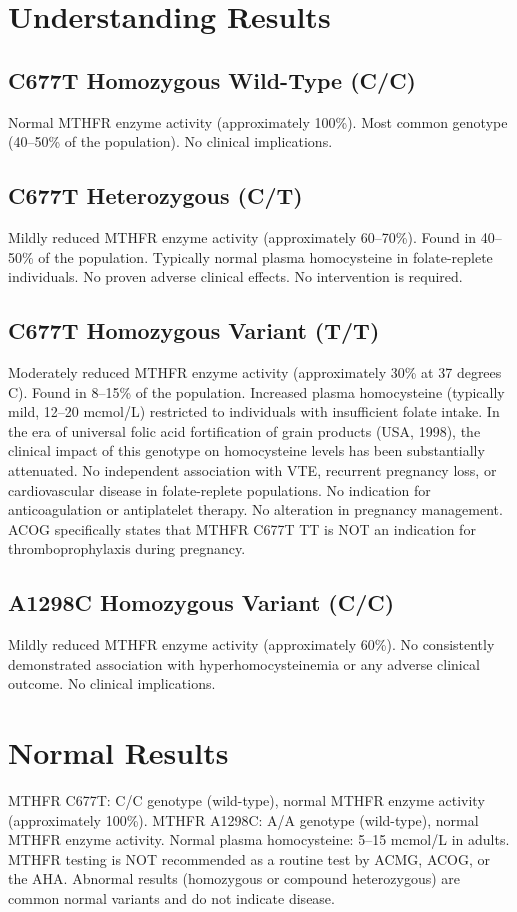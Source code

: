 \section*{Understanding Results}

\subsection*{C677T Homozygous Wild-Type (C/C)}
Normal MTHFR enzyme activity (approximately 100\%). Most common genotype (40--50\% of the population). No clinical implications.

\subsection*{C677T Heterozygous (C/T)}
Mildly reduced MTHFR enzyme activity (approximately 60--70\%). Found in 40--50\% of the population. Typically normal plasma homocysteine in folate-replete individuals. No proven adverse clinical effects. No intervention is required.

\subsection*{C677T Homozygous Variant (T/T)}
Moderately reduced MTHFR enzyme activity (approximately 30\% at 37 degrees C). Found in 8--15\% of the population. Increased plasma homocysteine (typically mild, 12--20 mcmol/L) restricted to individuals with insufficient folate intake. In the era of universal folic acid fortification of grain products (USA, 1998), the clinical impact of this genotype on homocysteine levels has been substantially attenuated. No independent association with VTE, recurrent pregnancy loss, or cardiovascular disease in folate-replete populations. No indication for anticoagulation or antiplatelet therapy. No alteration in pregnancy management. ACOG specifically states that MTHFR C677T TT is NOT an indication for thromboprophylaxis during pregnancy.

\subsection*{A1298C Homozygous Variant (C/C)}
Mildly reduced MTHFR enzyme activity (approximately 60\%). No consistently demonstrated association with hyperhomocysteinemia or any adverse clinical outcome. No clinical implications.

\section*{Normal Results}
MTHFR C677T: C/C genotype (wild-type), normal MTHFR enzyme activity (approximately 100\%). MTHFR A1298C: A/A genotype (wild-type), normal MTHFR enzyme activity. Normal plasma homocysteine: 5--15 mcmol/L in adults. MTHFR testing is NOT recommended as a routine test by ACMG, ACOG, or the AHA. Abnormal results (homozygous or compound heterozygous) are common normal variants and do not indicate disease.

